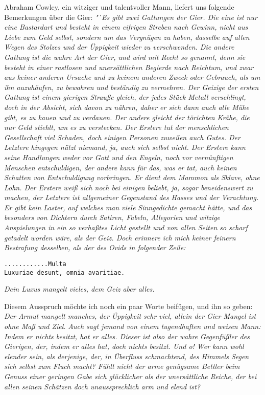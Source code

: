 Abraham Cowley, ein witziger und talentvoller
Mann, liefert uns folgende
Bemerkungen über die Gier:
\textit{"`Es gibt zwei Gattungen der Gier. Die eine ist
nur eine Bastardart und besteht in einem eifrigen Streben nach Gewinn, nicht
aus Liebe zum Geld selbst, sondern um das Vergnügen zu haben, dasselbe auf
allen Wegen des Stolzes und der Üppigkeit wieder zu verschwenden. Die andere
Gattung ist die wahre Art der Gier, und wird mit Recht so genannt, denn sie
besteht in einer rastlosen und unersättlichen Begierde nach Reichtum, und zwar
aus keiner anderen Ursache und zu keinem anderen Zweck oder Gebrauch, als um
ihn auzuhäufen, zu bewahren und beständig zu vermehren. Der Geizige der ersten
Gattung ist einem gierigen Strauße
gleich, der jedes Stück Metall verschlingt,
doch in der Absicht, sich davon zu nähren, daher er sich dann auch alle Mühe
gibt, es zu kauen und zu verdauen. Der andere gleicht der törichten Krähe, die
nur Geld stiehlt, um es zu verstecken.  Der
Erstere tut der menschlichen
Gesellschaft viel Schaden, doch einigen Personen zuweilen auch Gutes. Der
Letztere hingegen nützt niemand, ja, auch sich selbst nicht. Der Erstere kann
seine Handlungen weder vor Gott und den Engeln, noch vor
vernünftigen Menschen
entschuldigen, der andere kann für das, was er tat, auch keinen Schatten von
Entschuldigung vorbringen. Er dient dem Mammon als Sklave, ohne Lohn. Der
Erstere weiß sich noch bei einigen beliebt, ja, sogar beneidenswert zu machen,
der Letztere ist allgemeiner Gegenstand des Hasses und der Verachtung. Er gibt
kein Laster, auf welches man viele Sinngedichte gemacht hätte, und das
besonders von Dichtern durch Satiren, Fabeln, Allegorien und witzige
Anspielungen in ein so verhaßtes Licht gestellt und von allen Seiten so scharf
getadelt worden wäre, als der Geiz. Doch erinnere ich mich keiner feinern
Bestrafung desselben, als der des Ovids
in folgender Zeile:}

\medskip

\texttt{............Multa} \\
\texttt{Luxuriae desunt, omnia avaritiae.}

\medskip

\textit{Dein Luxus mangelt vieles, dem Geiz aber alles.}

\medskip

Diesem Ausspruch möchte ich noch ein paar Worte beifügen, und ihn so geben:
\textit{Der Armut mangelt manches, der Üppigkeit sehr viel,
allein der Gier Mangel ist ohne Maß und Ziel.}
\textit{Auch sagt jemand von einem tugendhaften und weisen Mann: Indem er
nichts
besitzt, hat er alles. Dieser ist also der wahre Gegenfüßler des Gierigen, der,
indem er alles hat, doch nichts besitzt. Und o! Wer kann wohl elender sein, als
derjenige, der, in Überfluss schmachtend, des Himmels Segen sich selbst zum
Fluch macht? Fühlt nicht der arme genügsame
Bettler beim Genuss einer geringen
Gabe sich glücklicher als der unersättliche Reiche, der bei allen seinen
Schätzen doch unaussprechlich arm und elend ist?}

